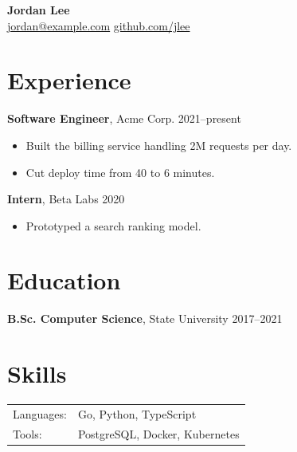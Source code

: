 \documentclass[11pt]{article}
\begin{document}
\begin{center}
  {\LARGE \textbf{Jordan Lee}}\\[4pt]
  \href{mailto:jordan@example.com}{jordan@example.com} \quad
  \href{https://github.com/jlee}{github.com/jlee}
\end{center}

\section{Experience}
\textbf{Software Engineer}, Acme Corp. \hfill 2021--present
\begin{itemize}[leftmargin=*,noitemsep]
  \item Built the billing service handling 2M requests per day.
  \item Cut deploy time from 40 to 6 minutes.
\end{itemize}

\textbf{Intern}, Beta Labs \hfill 2020
\begin{itemize}[leftmargin=*,noitemsep]
  \item Prototyped a search ranking model.
\end{itemize}

\section{Education}
\textbf{B.Sc. Computer Science}, State University \hfill 2017--2021

\section{Skills}
\begin{tabular}{@{}ll}
  Languages: & Go, Python, TypeScript \\
  Tools: & PostgreSQL, Docker, Kubernetes \\
\end{tabular}
\end{document}
